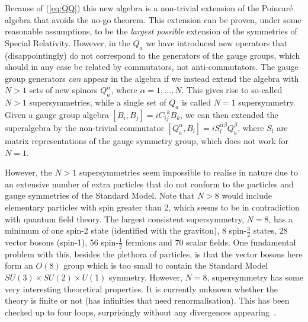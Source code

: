 \documentclass[notes.tex]{subfiles}
\begin{document}
Because of (\ref{eq:QQ}) this new algebra is a non-trivial extension of the Poincaré algebra that avoids the no-go theorem. This extension can be proven, under some reasonable assumptions, to be the {\it largest possible} extension of the symmetries of Special Relativity. However, in the $Q_a$ we have introduced new operators that (disappointingly) do not correspond to the generators of the gauge groups, which should in any case  be related by commutators, not anti-commutators. The gauge group generators {\it can} appear in the algebra if we instead extend the algebra with $N>1$ sets of new spinors $Q_a^\alpha$, where $\alpha = 1,\ldots,N$. This gives rise to so-called $N>1$ supersymmetries, while a single set of $Q_a$ is called $N=1$ supersymmetry. Given a gauge group algebra $[B_i,B_j]=iC_{ij}^{~~k}B_k$, we can then extended the superalgebra by the non-trivial commutator $[Q_a^\alpha,B_l]=iS_l^{\alpha\beta}Q_a^\beta$, where $S_l$ are matrix representations of the gauge symmetry group, which does not work for $N=1$. 

However, the $N>1$ supersymmetries seem impossible to realise in nature due to an extensive number of extra particles that do not conform to the particles and gauge symmetries of the Standard Model. Note that $N>8$ would include elementary particles with spin greater than 2, which seems to be in contradiction with quantum field theory.
The largest consistent supersymmetry, $N=8$, has a minimum of one spin-2 state (identified with the graviton), 8 spin-$\frac{3}{2}$ states, 28 vector bosons (spin-1),  56 spin-$\frac{1}{2}$ fermions and 70 scalar fields. One fundamental problem with this, besides the plethora of particles, is that the vector bosons here form an $O(8)$ group which is too small to contain the Standard Model $SU(3)\times SU(2)\times U(1)$ symmetry. However, $N=8$, supersymmetry has some very interesting theoretical properties. It is currently unknown whether the theory is finite or not (has infinities that need renormalisation). This has been checked up to four loops, surprisingly without any divergences appearing~\cite{Bern:2009kd}.
\end{document}
